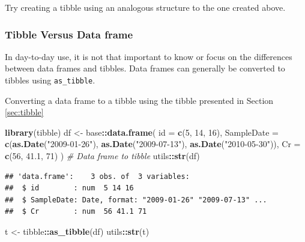 \documentclass[
]{book}
\newenvironment{Shaded}{\begin{snugshade}}{\end{snugshade}}
\newcommand{\AttributeTok}[1]{\textcolor[rgb]{0.13,0.29,0.53}{#1}}
\newcommand{\CommentTok}[1]{\textcolor[rgb]{0.56,0.35,0.01}{\textit{#1}}}
\newcommand{\DecValTok}[1]{\textcolor[rgb]{0.00,0.00,0.81}{#1}}
\newcommand{\FloatTok}[1]{\textcolor[rgb]{0.00,0.00,0.81}{#1}}
\newcommand{\FunctionTok}[1]{\textcolor[rgb]{0.13,0.29,0.53}{\textbf{#1}}}
\newcommand{\NormalTok}[1]{#1}
\newcommand{\OtherTok}[1]{\textcolor[rgb]{0.56,0.35,0.01}{#1}}
\newcommand{\SpecialCharTok}[1]{\textcolor[rgb]{0.81,0.36,0.00}{\textbf{#1}}}
\newcommand{\StringTok}[1]{\textcolor[rgb]{0.31,0.60,0.02}{#1}}
\begin{document}
Try creating a tibble using an analogous structure to the one created above.

\subsubsection{Tibble Versus Data frame}\label{sec:tibbleVsDataFrame}

In day-to-day use, it is not that important to know or focus on the differences between data frames and tibbles. Data frames can generally be converted to tibbles using \texttt{as\_tibble}.

Converting a data frame to a tibble using the tibble presented in Section \ref{sec:tibble}

\begin{Shaded}
\begin{Highlighting}[]
\FunctionTok{library}\NormalTok{(tibble)}
\NormalTok{df }\OtherTok{\textless{}{-}}\NormalTok{ base}\SpecialCharTok{::}\FunctionTok{data.frame}\NormalTok{(}
    \AttributeTok{id =} \FunctionTok{c}\NormalTok{(}\DecValTok{5}\NormalTok{, }\DecValTok{14}\NormalTok{, }\DecValTok{16}\NormalTok{),}
    \AttributeTok{SampleDate =} \FunctionTok{c}\NormalTok{(}\FunctionTok{as.Date}\NormalTok{(}\StringTok{"2009{-}01{-}26"}\NormalTok{), }\FunctionTok{as.Date}\NormalTok{(}\StringTok{"2009{-}07{-}13"}\NormalTok{), }
            \FunctionTok{as.Date}\NormalTok{(}\StringTok{"2010{-}05{-}30"}\NormalTok{)),}
    \AttributeTok{Cr =} \FunctionTok{c}\NormalTok{(}\DecValTok{56}\NormalTok{, }\FloatTok{41.1}\NormalTok{, }\DecValTok{71}\NormalTok{)}
\NormalTok{)}
\CommentTok{\# Data frame to tibble }
\NormalTok{utils}\SpecialCharTok{::}\FunctionTok{str}\NormalTok{(df)}
\end{Highlighting}
\end{Shaded}

\begin{verbatim}
## 'data.frame':    3 obs. of  3 variables:
##  $ id        : num  5 14 16
##  $ SampleDate: Date, format: "2009-01-26" "2009-07-13" ...
##  $ Cr        : num  56 41.1 71
\end{verbatim}

\begin{Shaded}
\begin{Highlighting}[]
\NormalTok{t }\OtherTok{\textless{}{-}}\NormalTok{ tibble}\SpecialCharTok{::}\FunctionTok{as\_tibble}\NormalTok{(df)}
\NormalTok{utils}\SpecialCharTok{::}\FunctionTok{str}\NormalTok{(t)}
\end{Highlighting}
\end{Shaded}
\end{document}
